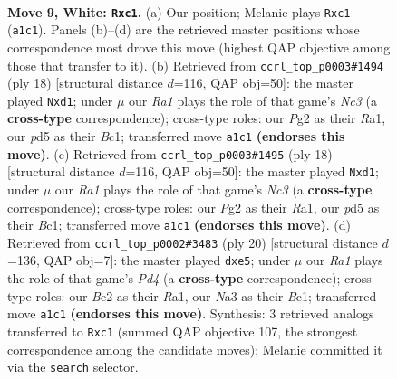 \documentclass[11pt]{article}
\begin{document}
\clearpage

\begin{figure}[p]\centering
\begin{subfigure}{0.46\textwidth}\centering
\resizebox{\linewidth}{!}{%
\newchessgame
\chessboard[
  setfen={rn2kbnr/pp3ppp/4p3/2ppPb2/3P4/N3BN2/P1P1BPPP/R1q1K2R w KQkq - 0 9},
  showmover=false,
  pgfstyle=straightmove, color=movearrow, markmove={a1-c1}
]}
\caption{}
\end{subfigure}\hfill
\begin{subfigure}{0.46\textwidth}\centering
\resizebox{\linewidth}{!}{%
\newchessgame
\chessboard[
  setfen={rn2kb1r/1b2pppp/p4n2/1pP5/8/1BN2N1P/PPP2PP1/R1BqK2R w KQkq - 0 10},
  showmover=false,
  pgfstyle=straightmove, color=movearrow, markmove={c3-d1}
]}
\caption{}
\end{subfigure}
\\[4pt]
\begin{subfigure}{0.46\textwidth}\centering
\resizebox{\linewidth}{!}{%
\newchessgame
\chessboard[
  setfen={rn2kb1r/1b2pppp/p4n2/1pP5/8/1BN2N1P/PPP2PP1/R1BqK2R w KQkq - 0 10},
  showmover=false,
  pgfstyle=straightmove, color=movearrow, markmove={c3-d1}
]}
\caption{}
\end{subfigure}\hfill
\begin{subfigure}{0.46\textwidth}\centering
\resizebox{\linewidth}{!}{%
\newchessgame
\chessboard[
  setfen={r3k1nr/pp2p1bp/n1p1b1p1/3pp3/2PP4/1PN2N1P/1P2BPP1/R1B1K2R w KQkq - 0 11},
  showmover=false,
  pgfstyle=straightmove, color=movearrow, markmove={d4-e5}
]}
\caption{}
\end{subfigure}
\caption{\textbf{Move 9, White: \texttt{Rxc1}.} (a) Our position; Melanie plays \texttt{Rxc1} (\texttt{a1c1}). Panels (b)--(d) are the retrieved master positions whose correspondence most drove this move (highest QAP objective among those that transfer to it). (b) Retrieved from \texttt{ccrl\_top\_p0003\#1494} (ply 18) [structural distance $d$=116, QAP obj=50]: the master played \texttt{Nxd1}; under $\mu$ our \emph{Ra1} plays the role of that game's \emph{Nc3} (a \textbf{cross-type} correspondence); cross-type roles: our \emph{P}g2 as their \emph{R}a1, our \emph{p}d5 as their \emph{B}c1; transferred move \texttt{a1c1} \textbf{(endorses this move)}. (c) Retrieved from \texttt{ccrl\_top\_p0003\#1495} (ply 18) [structural distance $d$=116, QAP obj=50]: the master played \texttt{Nxd1}; under $\mu$ our \emph{Ra1} plays the role of that game's \emph{Nc3} (a \textbf{cross-type} correspondence); cross-type roles: our \emph{P}g2 as their \emph{R}a1, our \emph{p}d5 as their \emph{B}c1; transferred move \texttt{a1c1} \textbf{(endorses this move)}. (d) Retrieved from \texttt{ccrl\_top\_p0002\#3483} (ply 20) [structural distance $d$=136, QAP obj=7]: the master played \texttt{dxe5}; under $\mu$ our \emph{Ra1} plays the role of that game's \emph{Pd4} (a \textbf{cross-type} correspondence); cross-type roles: our \emph{B}e2 as their \emph{R}a1, our \emph{N}a3 as their \emph{B}c1; transferred move \texttt{a1c1} \textbf{(endorses this move)}. Synthesis: 3 retrieved analogs transferred to \texttt{Rxc1} (summed QAP objective 107, the strongest correspondence among the candidate moves); Melanie committed it via the \texttt{search} selector.}

\end{figure}
\end{document}
